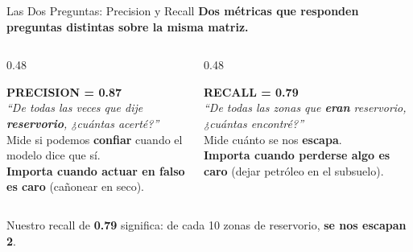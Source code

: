 \documentclass[aspectratio=169, 11pt]{beamer}
\begin{document}
\begin{frame}[shrink=8]{Las Dos Preguntas: Precision y Recall}
  \vspace{-4pt}
  {\small\color{arcaDark}\bfseries
    Dos métricas que responden preguntas \textbf{distintas} sobre la misma matriz.}

  \vspace{6pt}
  \begin{columns}[T]
    \begin{column}{0.48\textwidth}
      \begin{tcolorbox}[colback=arcaGray, colframe=codeBlue, boxrule=0pt, leftrule=3pt,
        arc=3pt, left=6pt, right=6pt, top=5pt, bottom=5pt]
        {\footnotesize\color{codeBlue}\bfseries PRECISION = 0.87}\\[4pt]
        {\scriptsize\color{arcaDark}\itshape
          ``De todas las veces que dije \textbf{reservorio},
          ¿cuántas acerté?''}\\[5pt]
        {\scriptsize\color{textMuted}
          Mide si podemos \textbf{confiar} cuando el modelo dice que sí.\\[4pt]
          \textbf{Importa cuando actuar en falso es caro}
          (cañonear en seco).}
      \end{tcolorbox}
    \end{column}
    \begin{column}{0.48\textwidth}
      \begin{tcolorbox}[colback=arcaGray, colframe=arcaRed, boxrule=0pt, leftrule=3pt,
        arc=3pt, left=6pt, right=6pt, top=5pt, bottom=5pt]
        {\footnotesize\color{arcaRed}\bfseries RECALL = 0.79}\\[4pt]
        {\scriptsize\color{arcaDark}\itshape
          ``De todas las zonas que \textbf{eran} reservorio,
          ¿cuántas encontré?''}\\[5pt]
        {\scriptsize\color{textMuted}
          Mide cuánto se nos \textbf{escapa}.\\[4pt]
          \textbf{Importa cuando perderse algo es caro}
          (dejar petróleo en el subsuelo).}
      \end{tcolorbox}
    \end{column}
  \end{columns}

  \vspace{8pt}
  \centering
  {\footnotesize\color{arcaDark}
    Nuestro recall de \textbf{0.79} significa: de cada 10 zonas de reservorio,
    \textbf{se nos escapan 2}.}
\end{frame}
\end{document}
